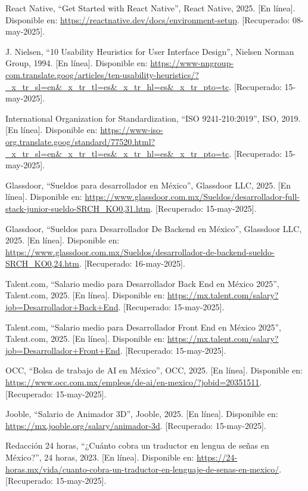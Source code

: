 \begin{thebibliography}{200}
    React Native, “Get Started with React Native”, React Native, 2025. [En línea]. Disponible en: \url{https://reactnative.dev/docs/environment-setup}. [Recuperado: 08-may-2025].

    J. Nielsen, “10 Usability Heuristics for User Interface Design”, Nielsen Norman Group, 1994. [En línea]. Disponible en: \url{https://www-nngroup-com.translate.goog/articles/ten-usability-heuristics/?_x_tr_sl=en&_x_tr_tl=es&_x_tr_hl=es&_x_tr_pto=tc}. [Recuperado: 15-may-2025].

    International Organization for Standardization, “ISO 9241-210:2019”, ISO, 2019. [En línea]. Disponible en: \url{https://www-iso-org.translate.goog/standard/77520.html?_x_tr_sl=en&_x_tr_tl=es&_x_tr_hl=es&_x_tr_pto=tc}. [Recuperado: 15-may-2025].

    Glassdoor, “Sueldos para desarrollador en México”, Glassdoor LLC, 2025. [En línea]. Disponible en: \url{https://www.glassdoor.com.mx/Sueldos/desarrollador-full-stack-junior-sueldo-SRCH_KO0,31.htm}. [Recuperado: 15-may-2025].

    Glassdoor, “Sueldos para Desarrollador De Backend en México”, Glassdoor LLC, 2025. [En línea]. Disponible en: \url{https://www.glassdoor.com.mx/Sueldos/desarrollador-de-backend-sueldo-SRCH_KO0,24.htm}. [Recuperado: 16-may-2025].

    Talent.com, “Salario medio para Desarrollador Back End en México 2025”, Talent.com, 2025. [En línea]. Disponible en: \url{https://mx.talent.com/salary?job=Desarrollador+Back+End}. [Recuperado: 15-may-2025].

    Talent.com, “Salario medio para Desarrollador Front End en México 2025”, Talent.com, 2025. [En línea]. Disponible en: \url{https://mx.talent.com/salary?job=Desarrollador+Front+End}. [Recuperado: 15-may-2025].

    OCC, “Bolsa de trabajo de AI en México”, OCC, 2025. [En línea]. Disponible en: \url{https://www.occ.com.mx/empleos/de-ai/en-mexico/?jobid=20351511}. [Recuperado: 15-may-2025].

    Jooble, “Salario de Animador 3D”, Jooble, 2025. [En línea]. Disponible en: \url{https://mx.jooble.org/salary/animador-3d}. [Recuperado: 15-may-2025]. 

    Redacción 24 horas, “¿Cuánto cobra un traductor en lengua de señas en México?”, 24 horas, 2023. [En línea]. Disponible en: \url{https://24-horas.mx/vida/cuanto-cobra-un-traductor-en-lenguaje-de-senas-en-mexico/}. [Recuperado: 15-may-2025].


\end{thebibliography}

